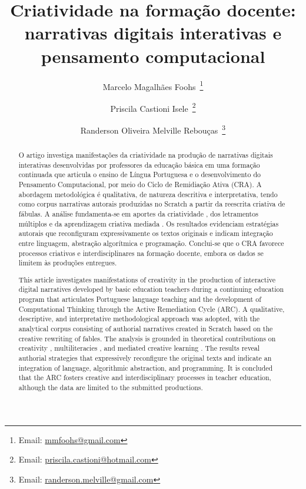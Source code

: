 \documentclass[portuguese]{textolivre}
\title{Criatividade na formação docente: narrativas digitais interativas e pensamento computacional}
\author[1]{Marcelo Magalhães Foohs~\orcid{0000-0002-4735-0732}\thanks{Email: \href{mailto:mmfoohs@gmail.com}{mmfoohs@gmail.com}}}
\author[1]{Priscila Castioni Isele~\orcid{0000-0002-1040-6608}\thanks{Email: \href{mailto:priscila.castioni@hotmail.com}{priscila.castioni@hotmail.com}}}
\author[1]{Randerson Oliveira Melville Rebouças~\orcid{0009-0005-3056-5074}\thanks{Email: \href{randerson.melville@gmail.com}{randerson.melville@gmail.com}}}
\affil[1]{Universidade Federal do Rio Grande do Sul, CINTED/PPGIE, Porto Alegre, RS, Brasil.}
\begin{document}
\maketitle

\begin{polyabstract}
\begin{abstract}
O artigo investiga manifestações da criatividade na produção de narrativas digitais interativas desenvolvidas por professores da educação básica em uma formação continuada que articula o ensino de Língua Portuguesa e o desenvolvimento do Pensamento Computacional, por meio do Ciclo de Remidiação Ativa (CRA). A abordagem metodológica é qualitativa, de natureza descritiva e interpretativa, tendo como corpus narrativas autorais produzidas no Scratch a partir da reescrita criativa de fábulas. A análise fundamenta-se em aportes da criatividade \cite{torrance1995}, dos letramentos múltiplos \cite{rojo2012} e da aprendizagem criativa mediada \cite{sawyer2004}. Os resultados evidenciam estratégias autorais que reconfiguram expressivamente os textos originais e indicam integração entre linguagem, abstração algorítmica e programação. Conclui-se que o CRA favorece processos criativos e interdisciplinares na formação docente, embora os dados se limitem às produções entregues.

\end{abstract}

\begin{english}
\begin{abstract}
This article investigates manifestations of creativity in the production of interactive digital narratives developed by basic education teachers during a continuing education program that articulates Portuguese language teaching and the development of Computational Thinking through the Active Remediation Cycle (ARC). A qualitative, descriptive, and interpretative methodological approach was adopted, with the analytical corpus consisting of authorial narratives created in Scratch based on the creative rewriting of fables. The analysis is grounded in theoretical contributions on creativity \cite{torrance1995}, multiliteracies \cite{rojo2012}, and mediated creative learning \cite{sawyer2004}. The results reveal authorial strategies that expressively reconfigure the original texts and indicate an integration of language, algorithmic abstraction, and programming. It is concluded that the ARC fosters creative and interdisciplinary processes in teacher education, although the data are limited to the submitted productions.

\end{abstract}
\end{english}
\end{polyabstract}
\end{document}
